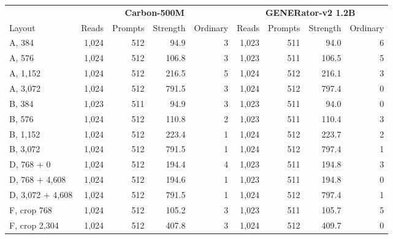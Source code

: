 \begin{tabular}{@{}l rrrr@{\hspace{10pt}}rrrr@{}}
\toprule
& \multicolumn{4}{c}{\textbf{Carbon-500M}} & \multicolumn{4}{c}{\textbf{GENERator-v2 1.2B}} \\
\cmidrule(lr){2-5}\cmidrule(l){6-9}
Layout & Reads & Prompts & Strength & Ordinary & Reads & Prompts & Strength & Ordinary \\
\midrule
A, 384 & 1{,}024 & 512 & 94.9 & 3 & 1{,}023 & 511 & 94.0 & 6 \\
A, 576 & 1{,}024 & 512 & 106.8 & 3 & 1{,}023 & 511 & 106.5 & 5 \\
A, 1{,}152 & 1{,}024 & 512 & 216.5 & 5 & 1{,}024 & 512 & 216.1 & 3 \\
A, 3{,}072 & 1{,}024 & 512 & 791.5 & 3 & 1{,}024 & 512 & 797.4 & 0 \\
\midrule
B, 384 & 1{,}023 & 511 & 94.9 & 3 & 1{,}023 & 511 & 94.0 & 0 \\
B, 576 & 1{,}024 & 512 & 110.8 & 2 & 1{,}023 & 511 & 110.4 & 3 \\
B, 1{,}152 & 1{,}024 & 512 & 223.4 & 1 & 1{,}024 & 512 & 223.7 & 2 \\
B, 3{,}072 & 1{,}024 & 512 & 791.5 & 1 & 1{,}024 & 512 & 797.4 & 1 \\
\midrule
D, 768 + 0 & 1{,}024 & 512 & 194.4 & 4 & 1{,}023 & 511 & 194.8 & 3 \\
D, 768 + 4{,}608 & 1{,}024 & 512 & 194.6 & 1 & 1{,}023 & 511 & 194.8 & 0 \\
D, 3{,}072 + 4{,}608 & 1{,}024 & 512 & 791.5 & 1 & 1{,}024 & 512 & 797.4 & 1 \\
\midrule
F, crop 768 & 1{,}024 & 512 & 105.2 & 3 & 1{,}023 & 511 & 105.7 & 5 \\
F, crop 2{,}304 & 1{,}024 & 512 & 407.8 & 3 & 1{,}024 & 512 & 409.7 & 0 \\
\bottomrule
\end{tabular}
